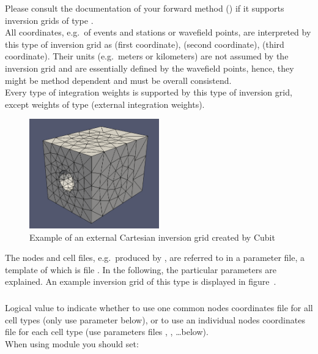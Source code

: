 Please consult the documentation of your forward method () if it supports
inversion grids of type . \\
All coordinates, e.g.\ of events and stations or wavefield points, are interpreted by this type of inversion grid as
 (first coordinate),  (second coordinate),  (third coordinate). Their
units (e.g.\ meters or kilometers) are not assumed by the inversion grid and are essentially defined by the wavefield
points, hence, they might be method dependent and must be overall consistend.\\
Every type of integration weights is supported by this type of inversion grid, except weights of type 
 (external integration weights).

\begin{figure}[ht]
  \centering
  \includegraphics[width=0.5\textwidth]{images/ecartInversionGrid_manual.png}
  \caption{Example of an external Cartesian inversion grid created by Cubit}
  \label{basic_steps,sec:invgrid,sub:ecart,fig:grid}
\end{figure}

The nodes and cell files, e.g.\ produced by , are referred to in a parameter file, a template 
of which is file . In the following, the particular 
parameters are explained. An example inversion grid of this type is displayed in 
figure~.

\subsubsection{}
Logical value to indicate whether to use one common nodes coordinates file for 
all cell types (only use parameter  below), or to use an individual 
nodes coordinates file for each cell type (use parameters files , 
, \dots below).\\
When using module  you should set:\\
